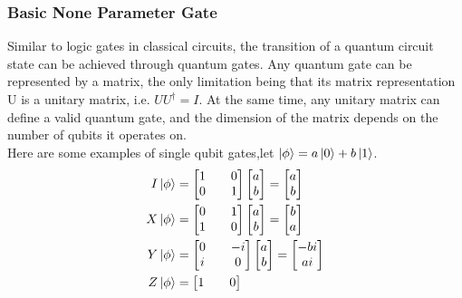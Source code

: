 \subsubsection{Basic None Parameter Gate}
Similar to logic gates in classical circuits, the transition of a quantum circuit state can be achieved through quantum gates. Any quantum gate can be represented by a matrix, the only limitation being that its matrix representation U is a unitary matrix, i.e. ${UU^{\dagger}=I}$.
At the same time, any unitary matrix can define a valid quantum gate, and the dimension of the matrix depends on the number of qubits it operates on.\\
Here are some examples of single qubit gates,let $\ket{\phi}=a\ket{0}+b\ket{1}$.\\
\begin{align*}
I\ket{\phi}&=\begin{bmatrix}
1 && 0\\
0 && 1
\end{bmatrix}\begin{bmatrix}
    a\\
    b
\end{bmatrix}=\begin{bmatrix}
    a\\
    b
\end{bmatrix} %
\\
X\ket{\phi}&=\begin{bmatrix}
0 && 1\\
    1 && 0
\end{bmatrix}\begin{bmatrix}
    a\\
    b
\end{bmatrix}=\begin{bmatrix}
    b\\
    a
\end{bmatrix} %
\\
Y\ket{\phi}&=\begin{bmatrix}
    0 && -i\\
    i && 0
\end{bmatrix}\begin{bmatrix}
    a\\
    b
\end{bmatrix}=\begin{bmatrix}
    -bi\\
    ai
\end{bmatrix} %
\\
Z\ket{\phi}&=\begin{bmatrix}
    1 && 0\\

\end{bmatrix}
\end{align*}
